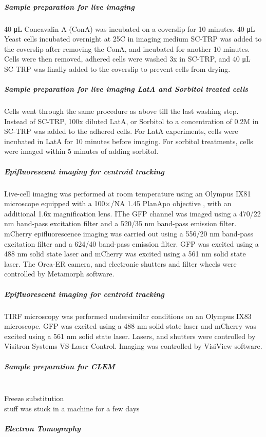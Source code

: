 \subparagraph{Sample preparation for live imaging}
40 μL Concavalin A (ConA) was incubated on a coverslip for 10 minutes. 40 μL Yeast cells incubated overnight at 25C in imaging medium SC-TRP was added to the coverslip after removing the ConA, and incubated for another 10 minutes. Cells were then removed, adhered cells were washed 3x in SC-TRP, and 40 μL SC-TRP was finally added to the coverslip to prevent cells from drying. 

\subparagraph{Sample preparation for live imaging LatA and Sorbitol treated cells}
Cells went through the same procedure as above till the last washing step. Instead of SC-TRP, 100x diluted LatA, or Sorbitol to a concentration of 0.2M in SC-TRP was added to the adhered cells. For LatA experiments, cells were incubated in LatA for 10 minutes before imaging. For sorbitol treatments, cells were imaged within 5 minutes of adding sorbitol.


\subparagraph{Epifluorescent imaging for centroid tracking}
Live-cell imaging was performed at room temperature using an Olympus IX81 microscope equipped with a 100×/NA 1.45 PlanApo objective , with an additional 1.6x magnification lens. IThe GFP channel was imaged using a 470/22 nm band-pass excitation filter and a 520/35 nm band-pass emission filter. mCherry epifluorescence imaging was carried out using a 556/20 nm band-pass excitation filter and a 624/40 band-pass emission filter. GFP was excited using a 488 nm solid state laser and mCherry was excited using a 561 nm solid state laser. The Orca-ER camera, and electronic shutters and filter wheels were controlled by Metamorph software.

\subparagraph{Epifluorescent imaging for centroid tracking}
TIRF microscopy was performed undersimilar conditions on an Olympus IX83 microscope. GFP was excited using a 488 nm solid state laser and mCherry was excited using a 561 nm solid state laser. Lasers, and shutters were controlled by Visitron Systems VS-Laser Control. Imaging was controlled  by VisiView software.

\subparagraph{Sample preparation for CLEM}
			\mbox{}\\
\subsubitem
Freeze substitution
			\mbox{}\\
			stuff was stuck in a machine for a few days

\subparagraph{Electron Tomography}


